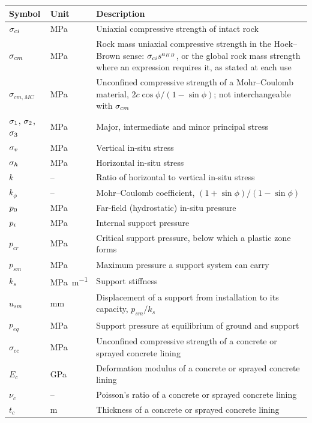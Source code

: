 \begin{longtable}{ll>{\raggedright\arraybackslash}p{}}
\toprule
Symbol & Unit & Description \\
\midrule
\endhead
$\sigma_{ci}$ & \si{\mega\pascal} & Uniaxial compressive strength of intact rock \\
$\sigma_{cm}$ & \si{\mega\pascal} & Rock mass uniaxial compressive strength in the Hoek--Brown sense: $\sigma_{ci} s^{a_{HB}}$, or the global rock mass strength where an expression requires it, as stated at each use \\
$\sigma_{cm,MC}$ & \si{\mega\pascal} & Unconfined compressive strength of a Mohr--Coulomb material, $2c\cos\phi/(1-\sin\phi)$; not interchangeable with $\sigma_{cm}$ \\
$\sigma_1$, $\sigma_2$, $\sigma_3$ & \si{\mega\pascal} & Major, intermediate and minor principal stress \\
$\sigma_v$ & \si{\mega\pascal} & Vertical in-situ stress \\
$\sigma_h$ & \si{\mega\pascal} & Horizontal in-situ stress \\
$k$ & -- & Ratio of horizontal to vertical in-situ stress \\
$k_\phi$ & -- & Mohr--Coulomb coefficient, $(1+\sin\phi)/(1-\sin\phi)$ \\
$p_0$ & \si{\mega\pascal} & Far-field (hydrostatic) in-situ pressure \\
$p_i$ & \si{\mega\pascal} & Internal support pressure \\
$p_{cr}$ & \si{\mega\pascal} & Critical support pressure, below which a plastic zone forms \\
$p_{sm}$ & \si{\mega\pascal} & Maximum pressure a support system can carry \\
$k_s$ & \si{\mega\pascal\per\metre} & Support stiffness \\
$u_{sm}$ & \si{\milli\metre} & Displacement of a support from installation to its capacity, $p_{sm}/k_s$ \\
$p_{eq}$ & \si{\mega\pascal} & Support pressure at equilibrium of ground and support \\
$\sigma_{cc}$ & \si{\mega\pascal} & Unconfined compressive strength of a concrete or sprayed concrete lining \\
$E_c$ & \si{\giga\pascal} & Deformation modulus of a concrete or sprayed concrete lining \\
$\nu_c$ & -- & Poisson's ratio of a concrete or sprayed concrete lining \\
$t_c$ & \si{\metre} & Thickness of a concrete or sprayed concrete lining \\

\end{longtable}
